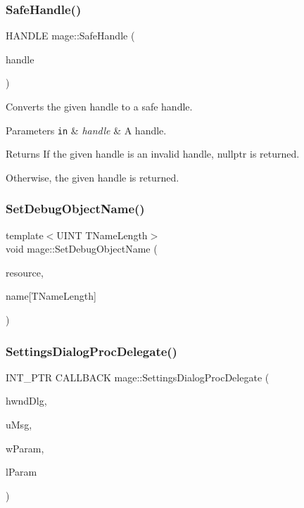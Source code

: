 \subsubsection{\texorpdfstring{Safe\+Handle()}{SafeHandle()}}
{\footnotesize\ttfamily H\+A\+N\+D\+LE mage\+::\+Safe\+Handle (\begin{DoxyParamCaption}\item[{H\+A\+N\+D\+LE}]{handle }\end{DoxyParamCaption})}

Converts the given handle to a safe handle.


\begin{DoxyParams}[1]{Parameters}
\mbox{\tt in}  & {\em handle} & A handle. \\
\hline
\end{DoxyParams}
\begin{DoxyReturn}{Returns}
If the given handle is an invalid handle, {\ttfamily nullptr} is returned. 

Otherwise, the given handle is returned. 
\end{DoxyReturn}
\hypertarget{namespacemage_a88833e1a7c6ad614ff6e88cb10eff532}{}\label{namespacemage_a88833e1a7c6ad614ff6e88cb10eff532} 
\subsubsection{\texorpdfstring{Set\+Debug\+Object\+Name()}{SetDebugObjectName()}}
{\footnotesize\ttfamily template$<$U\+I\+NT T\+Name\+Length$>$ \\
void mage\+::\+Set\+Debug\+Object\+Name (\begin{DoxyParamCaption}\item[{\+\_\+\+In\+\_\+ I\+D3\+D11\+Device\+Child $\ast$}]{resource,  }\item[{\+\_\+\+In\+\_\+ const char(\&)}]{name\mbox{[}\+T\+Name\+Length\mbox{]} }\end{DoxyParamCaption})}

\hypertarget{namespacemage_a6b352e8d2bf3eeccf1a5dec3f1cf4130}{}\label{namespacemage_a6b352e8d2bf3eeccf1a5dec3f1cf4130} 
\subsubsection{\texorpdfstring{Settings\+Dialog\+Proc\+Delegate()}{SettingsDialogProcDelegate()}}
{\footnotesize\ttfamily I\+N\+T\+\_\+\+P\+TR C\+A\+L\+L\+B\+A\+CK mage\+::\+Settings\+Dialog\+Proc\+Delegate (\begin{DoxyParamCaption}\item[{H\+W\+ND}]{hwnd\+Dlg,  }\item[{U\+I\+NT}]{u\+Msg,  }\item[{W\+P\+A\+R\+AM}]{w\+Param,  }\item[{L\+P\+A\+R\+AM}]{l\+Param }\end{DoxyParamCaption})}

